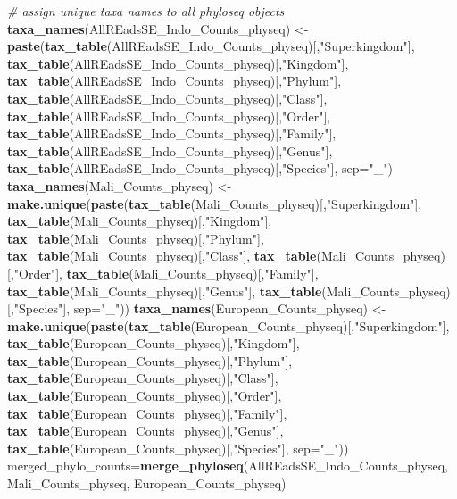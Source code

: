 \documentclass[]{article}
\newenvironment{Shaded}{\begin{snugshade}}{\end{snugshade}}
\newcommand{\CommentTok}[1]{\textcolor[rgb]{0.56,0.35,0.01}{\textit{#1}}}
\newcommand{\DataTypeTok}[1]{\textcolor[rgb]{0.13,0.29,0.53}{#1}}
\newcommand{\KeywordTok}[1]{\textcolor[rgb]{0.13,0.29,0.53}{\textbf{#1}}}
\newcommand{\NormalTok}[1]{#1}
\newcommand{\StringTok}[1]{\textcolor[rgb]{0.31,0.60,0.02}{#1}}
\begin{document}
\begin{Shaded}
\begin{Highlighting}[]
\CommentTok{# assign unique taxa names to all phyloseq objects}
\KeywordTok{taxa_names}\NormalTok{(AllREadsSE_Indo_Counts_physeq) <-}\StringTok{ }\KeywordTok{paste}\NormalTok{(}\KeywordTok{tax_table}\NormalTok{(AllREadsSE_Indo_Counts_physeq)[,}\StringTok{"Superkingdom"}\NormalTok{], }\KeywordTok{tax_table}\NormalTok{(AllREadsSE_Indo_Counts_physeq)[,}\StringTok{"Kingdom"}\NormalTok{], }\KeywordTok{tax_table}\NormalTok{(AllREadsSE_Indo_Counts_physeq)[,}\StringTok{"Phylum"}\NormalTok{], }\KeywordTok{tax_table}\NormalTok{(AllREadsSE_Indo_Counts_physeq)[,}\StringTok{"Class"}\NormalTok{], }\KeywordTok{tax_table}\NormalTok{(AllREadsSE_Indo_Counts_physeq)[,}\StringTok{"Order"}\NormalTok{], }\KeywordTok{tax_table}\NormalTok{(AllREadsSE_Indo_Counts_physeq)[,}\StringTok{"Family"}\NormalTok{], }\KeywordTok{tax_table}\NormalTok{(AllREadsSE_Indo_Counts_physeq)[,}\StringTok{"Genus"}\NormalTok{], }\KeywordTok{tax_table}\NormalTok{(AllREadsSE_Indo_Counts_physeq)[,}\StringTok{"Species"}\NormalTok{], }\DataTypeTok{sep=}\StringTok{"_"}\NormalTok{)}
\KeywordTok{taxa_names}\NormalTok{(Mali_Counts_physeq) <-}\StringTok{ }\KeywordTok{make.unique}\NormalTok{(}\KeywordTok{paste}\NormalTok{(}\KeywordTok{tax_table}\NormalTok{(Mali_Counts_physeq)[,}\StringTok{"Superkingdom"}\NormalTok{], }\KeywordTok{tax_table}\NormalTok{(Mali_Counts_physeq)[,}\StringTok{"Kingdom"}\NormalTok{], }\KeywordTok{tax_table}\NormalTok{(Mali_Counts_physeq)[,}\StringTok{"Phylum"}\NormalTok{], }\KeywordTok{tax_table}\NormalTok{(Mali_Counts_physeq)[,}\StringTok{"Class"}\NormalTok{], }\KeywordTok{tax_table}\NormalTok{(Mali_Counts_physeq)[,}\StringTok{"Order"}\NormalTok{], }\KeywordTok{tax_table}\NormalTok{(Mali_Counts_physeq)[,}\StringTok{"Family"}\NormalTok{], }\KeywordTok{tax_table}\NormalTok{(Mali_Counts_physeq)[,}\StringTok{"Genus"}\NormalTok{], }\KeywordTok{tax_table}\NormalTok{(Mali_Counts_physeq)[,}\StringTok{"Species"}\NormalTok{], }\DataTypeTok{sep=}\StringTok{"_"}\NormalTok{))}
\KeywordTok{taxa_names}\NormalTok{(European_Counts_physeq) <-}\StringTok{ }\KeywordTok{make.unique}\NormalTok{(}\KeywordTok{paste}\NormalTok{(}\KeywordTok{tax_table}\NormalTok{(European_Counts_physeq)[,}\StringTok{"Superkingdom"}\NormalTok{], }\KeywordTok{tax_table}\NormalTok{(European_Counts_physeq)[,}\StringTok{"Kingdom"}\NormalTok{], }\KeywordTok{tax_table}\NormalTok{(European_Counts_physeq)[,}\StringTok{"Phylum"}\NormalTok{], }\KeywordTok{tax_table}\NormalTok{(European_Counts_physeq)[,}\StringTok{"Class"}\NormalTok{], }\KeywordTok{tax_table}\NormalTok{(European_Counts_physeq)[,}\StringTok{"Order"}\NormalTok{], }\KeywordTok{tax_table}\NormalTok{(European_Counts_physeq)[,}\StringTok{"Family"}\NormalTok{], }\KeywordTok{tax_table}\NormalTok{(European_Counts_physeq)[,}\StringTok{"Genus"}\NormalTok{], }\KeywordTok{tax_table}\NormalTok{(European_Counts_physeq)[,}\StringTok{"Species"}\NormalTok{], }\DataTypeTok{sep=}\StringTok{"_"}\NormalTok{))}
\NormalTok{merged_phylo_counts=}\KeywordTok{merge_phyloseq}\NormalTok{(AllREadsSE_Indo_Counts_physeq, Mali_Counts_physeq, European_Counts_physeq)}


\end{Highlighting}
\end{Shaded}
\end{document}

